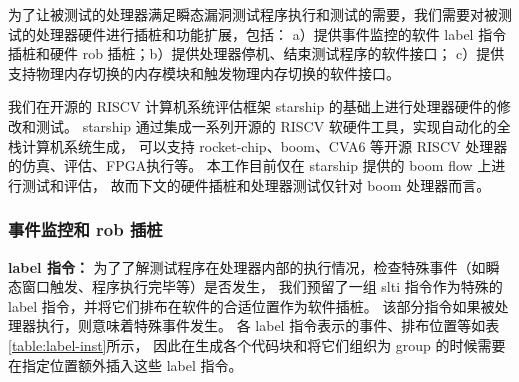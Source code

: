 为了让被测试的处理器满足瞬态漏洞测试程序执行和测试的需要，我们需要对被测试的处理器硬件进行插桩和功能扩展，包括：
a）提供事件监控的软件 label 指令插桩和硬件 rob 插桩；b）提供处理器停机、结束测试程序的软件接口；
c）提供支持物理内存切换的内存模块和触发物理内存切换的软件接口。\par

我们在开源的 RISCV 计算机系统评估框架 starship\cite{starship} 的基础上进行处理器硬件的修改和测试。
starship 通过集成一系列开源的 RISCV 软硬件工具，实现自动化的全栈计算机系统生成，
可以支持 rocket-chip\cite{rocket-chip}、boom\cite{celio2017boomv2}、CVA6\cite{cva6} 等开源 RISCV 处理器的仿真、评估、FPGA执行等。
本工作目前仅在 starship 提供的 boom flow 上进行测试和评估，
故而下文的硬件插桩和处理器测试仅针对 boom 处理器而言。\par

\subsubsection{事件监控和 rob 插桩}
\textbf{label 指令：}
为了了解测试程序在处理器内部的执行情况，检查特殊事件（如瞬态窗口触发、程序执行完毕等）是否发生，
我们预留了一组 slti 指令作为特殊的 label 指令，并将它们排布在软件的合适位置作为软件插桩。
该部分指令如果被处理器执行，则意味着特殊事件发生。
各 label 指令表示的事件、排布位置等如表\ref{table:label-inst}所示，
因此在生成各个代码块和将它们组织为 group 的时候需要在指定位置额外插入这些 label 指令。\par

